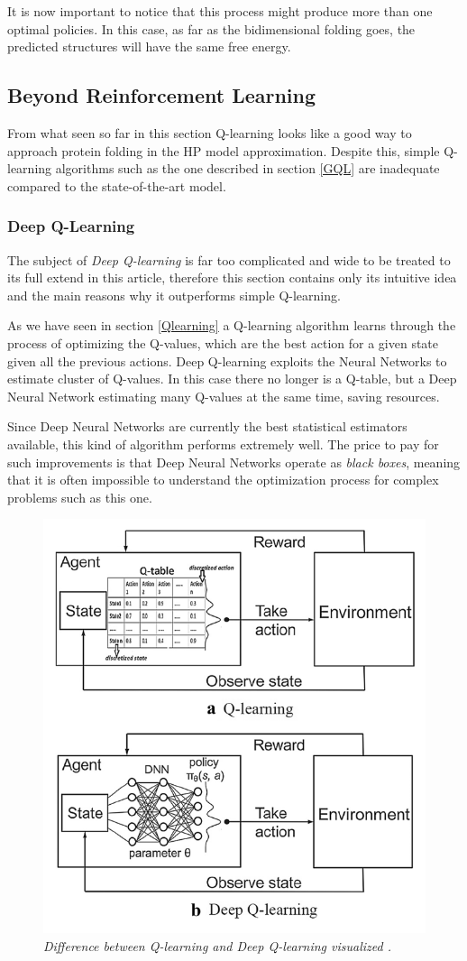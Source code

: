 It is now important to notice that this process might produce more than one optimal policies.
In this case, as far as the bidimensional folding goes, the predicted structures will have the same free energy.

\subsection{Beyond Reinforcement Learning}

From what seen so far in this section Q-learning looks like a good way to approach protein folding in the HP model approximation.
Despite this, simple Q-learning algorithms such as the one described in section \ref{GQL} are inadequate compared to the state-of-the-art model.

\subsubsection{Deep Q-Learning}

The subject of \emph{Deep Q-learning} is far too complicated and wide to be treated to its full extend in this article, therefore this section contains only its intuitive idea and the main reasons why it outperforms simple Q-learning.

As we have seen in section \ref{Qlearning} a Q-learning algorithm learns through the process of optimizing the Q-values, which are the best action for a given state given all the previous actions.
Deep Q-learning exploits the Neural Networks to estimate cluster of Q-values.
In this case there no longer is a Q-table, but a Deep Neural Network estimating many Q-values at the same time, saving resources. 

Since Deep Neural Networks are currently the best statistical estimators available, this kind of algorithm performs extremely well.
The price to pay for such improvements is that Deep Neural Networks operate as \textit{black boxes}, meaning that it is often impossible to understand the optimization process for complex problems such as this one.

\begin{figure}[H]
    \centering
    \includegraphics[width=.5\textwidth]{img/rl2.png}
    \caption{\emph{Difference between Q-learning and Deep Q-learning visualized \cite{jafari2020solving}.}}
    \label{fig:rl2}
\end{figure}